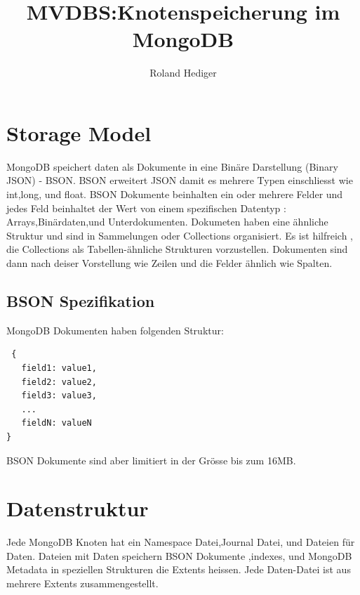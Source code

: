 \documentclass[a4paper,10pt]{scrartcl}
\title{MVDBS:Knotenspeicherung im MongoDB}
\author{Roland Hediger}
\begin{document}
\maketitle

\begin{abstract}

\end{abstract}

\section{Storage Model}
 MongoDB speichert daten als Dokumente in eine Binäre Darstellung (Binary JSON) - BSON.
 BSON erweitert JSON damit es mehrere Typen einschliesst wie int,long, und float. BSON Dokumente beinhalten ein oder 
mehrere Felder und jedes Feld beinhaltet der Wert von einem spezifischen Datentyp : Arrays,Binärdaten,und 
Unterdokumenten. Dokumeten haben eine ähnliche Struktur und sind in Sammelungen oder Collections organisiert. Es ist 
hilfreich , die Collections als Tabellen-ähnliche Strukturen vorzustellen. Dokumenten sind dann nach deiser Vorstellung 
wie Zeilen und die Felder ähnlich wie Spalten.

\subsection{BSON Spezifikation}
MongoDB Dokumenten haben folgenden Struktur:
\begin{verbatim}
 {
   field1: value1,
   field2: value2,
   field3: value3,
   ...
   fieldN: valueN
}
\end{verbatim}

BSON Dokumente sind aber limitiert in der Grösse bis zum 16MB.
\section{Datenstruktur}

Jede MongoDB Knoten hat ein Namespace Datei,Journal Datei, und Dateien für Daten.
Dateien mit Daten speichern BSON Dokumente ,indexes, und MongoDB Metadata in speziellen Strukturen die Extents heissen.
Jede Daten-Datei ist aus mehrere Extents zusammengestellt.
\end{document}
